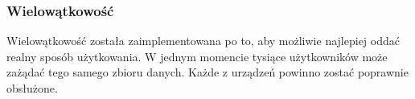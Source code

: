 \subsubsection{Wielowątkowość}
Wielowątkowość została zaimplementowana po to, aby możliwie najlepiej oddać realny sposób użytkowania.
W jednym momencie tysiące użytkowników może zażądać tego samego zbioru danych. Każde z urządzeń powinno zostać poprawnie obsłużone.